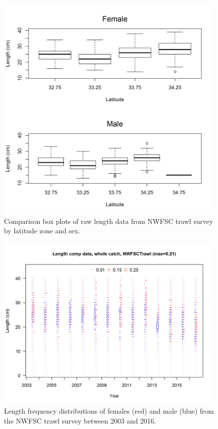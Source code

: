 \documentclass[12pt,]{article}
\begin{document}
\begin{figure}[htbp]
\centering
\includegraphics{Figures/NWFSCtrawl_lengthlat.png}
\caption{Comparison box plots of raw length data from NWFSC trawl survey
by latitude zone and sex. \label{fig:Fleet8_NWFSCtrawl_lengthlat}}
\end{figure}

\begin{figure}[htbp]
\centering
\includegraphics{r4ss/plots_mod1/comp_lendat_bubflt8mkt0.png}
\caption{Length frequency distributions of females (red) and male (blue)
from the NWFSC trawl survey between 2003 and 2016.
\label{fig:Fleet8_comp_lendat_bubflt8mkt0}}
\end{figure}
\end{document}
